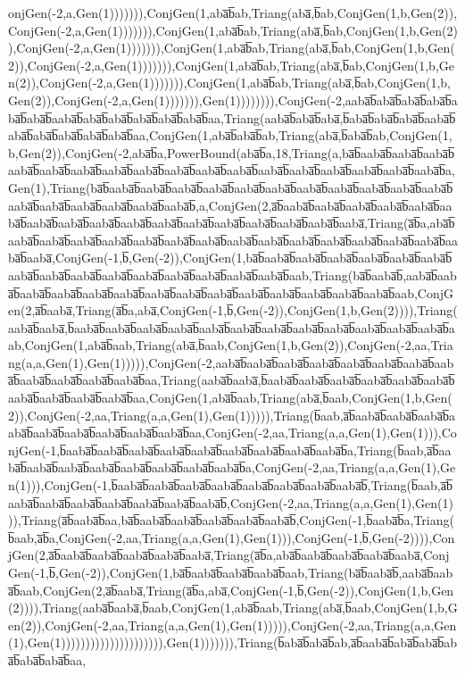 onjGen(-2,a,Gen(1))))))),ConjGen(1,aba̅b̅ab,Triang(aba̅,b̅ab,ConjGen(1,b,Gen(2)),ConjGen(-2,a,Gen(1))))))),ConjGen(1,aba̅b̅ab,Triang(aba̅,b̅ab,ConjGen(1,b,Gen(2)),ConjGen(-2,a,Gen(1))))))),ConjGen(1,aba̅b̅ab,Triang(aba̅,b̅ab,ConjGen(1,b,Gen(2)),ConjGen(-2,a,Gen(1))))))),ConjGen(1,aba̅b̅ab,Triang(aba̅,b̅ab,ConjGen(1,b,Gen(2)),ConjGen(-2,a,Gen(1))))))),ConjGen(1,aba̅b̅ab,Triang(aba̅,b̅ab,ConjGen(1,b,Gen(2)),ConjGen(-2,a,Gen(1))))))),Gen(1)))))))),ConjGen(-2,aaba̅b̅aba̅b̅aba̅b̅aba̅b̅aba̅b̅aba̅b̅aaba̅b̅aba̅b̅aba̅b̅aba̅b̅aba̅b̅aba̅b̅aa,Triang(aaba̅b̅aba̅b̅aba̅,b̅aba̅b̅aba̅b̅aba̅b̅aaba̅b̅aba̅b̅aba̅b̅aba̅b̅aba̅b̅aba̅b̅aa,ConjGen(1,aba̅b̅aba̅b̅ab,Triang(aba̅,b̅aba̅b̅ab,ConjGen(1,b,Gen(2)),ConjGen(-2,aba̅b̅a,PowerBound(aba̅b̅a,18,Triang(a,ba̅b̅aaba̅b̅aaba̅b̅aaba̅b̅aaba̅b̅aaba̅b̅aaba̅b̅aaba̅b̅aaba̅b̅aaba̅b̅aaba̅b̅aaba̅b̅aaba̅b̅aaba̅b̅aaba̅b̅aaba̅b̅aaba̅b̅aaba̅b̅a,Gen(1),Triang(ba̅b̅aaba̅b̅aaba̅b̅aaba̅b̅aaba̅b̅aaba̅b̅aaba̅b̅aaba̅b̅aaba̅b̅aaba̅b̅aaba̅b̅aaba̅b̅aaba̅b̅aaba̅b̅aaba̅b̅aaba̅b̅aaba̅b̅aaba̅b̅,a,ConjGen(2,a̅b̅aaba̅b̅aaba̅b̅aaba̅b̅aaba̅b̅aaba̅b̅aaba̅b̅aaba̅b̅aaba̅b̅aaba̅b̅aaba̅b̅aaba̅b̅aaba̅b̅aaba̅b̅aaba̅b̅aaba̅b̅aaba̅b̅aaba̅,Triang(a̅b̅a,aba̅b̅aaba̅b̅aaba̅b̅aaba̅b̅aaba̅b̅aaba̅b̅aaba̅b̅aaba̅b̅aaba̅b̅aaba̅b̅aaba̅b̅aaba̅b̅aaba̅b̅aaba̅b̅aaba̅b̅aaba̅b̅aaba̅,ConjGen(-1,b̅,Gen(-2)),ConjGen(1,ba̅b̅aaba̅b̅aaba̅b̅aaba̅b̅aaba̅b̅aaba̅b̅aaba̅b̅aaba̅b̅aaba̅b̅aaba̅b̅aaba̅b̅aaba̅b̅aaba̅b̅aaba̅b̅aaba̅b̅aaba̅b̅aab,Triang(ba̅b̅aaba̅b̅,aaba̅b̅aaba̅b̅aaba̅b̅aaba̅b̅aaba̅b̅aaba̅b̅aaba̅b̅aaba̅b̅aaba̅b̅aaba̅b̅aaba̅b̅aaba̅b̅aaba̅b̅aaba̅b̅aab,ConjGen(2,a̅b̅aaba̅,Triang(a̅b̅a,aba̅,ConjGen(-1,b̅,Gen(-2)),ConjGen(1,b,Gen(2)))),Triang(aaba̅b̅aaba̅,b̅aaba̅b̅aaba̅b̅aaba̅b̅aaba̅b̅aaba̅b̅aaba̅b̅aaba̅b̅aaba̅b̅aaba̅b̅aaba̅b̅aaba̅b̅aaba̅b̅aab,ConjGen(1,aba̅b̅aab,Triang(aba̅,b̅aab,ConjGen(1,b,Gen(2)),ConjGen(-2,aa,Triang(a,a,Gen(1),Gen(1))))),ConjGen(-2,aaba̅b̅aaba̅b̅aaba̅b̅aaba̅b̅aaba̅b̅aaba̅b̅aaba̅b̅aaba̅b̅aaba̅b̅aaba̅b̅aaba̅b̅aaba̅b̅aa,Triang(aaba̅b̅aaba̅,b̅aaba̅b̅aaba̅b̅aaba̅b̅aaba̅b̅aaba̅b̅aaba̅b̅aaba̅b̅aaba̅b̅aaba̅b̅aaba̅b̅aa,ConjGen(1,aba̅b̅aab,Triang(aba̅,b̅aab,ConjGen(1,b,Gen(2)),ConjGen(-2,aa,Triang(a,a,Gen(1),Gen(1))))),Triang(b̅aab,a̅b̅aaba̅b̅aaba̅b̅aaba̅b̅aaba̅b̅aaba̅b̅aaba̅b̅aaba̅b̅aaba̅b̅aaba̅b̅aa,ConjGen(-2,aa,Triang(a,a,Gen(1),Gen(1))),ConjGen(-1,b̅aaba̅b̅aaba̅b̅aaba̅b̅aaba̅b̅aaba̅b̅aaba̅b̅aaba̅b̅aaba̅b̅aaba̅b̅a,Triang(b̅aab,a̅b̅aaba̅b̅aaba̅b̅aaba̅b̅aaba̅b̅aaba̅b̅aaba̅b̅aaba̅b̅aaba̅b̅a,ConjGen(-2,aa,Triang(a,a,Gen(1),Gen(1))),ConjGen(-1,b̅aaba̅b̅aaba̅b̅aaba̅b̅aaba̅b̅aaba̅b̅aaba̅b̅aaba̅b̅aaba̅b̅,Triang(b̅aab,a̅b̅aaba̅b̅aaba̅b̅aaba̅b̅aaba̅b̅aaba̅b̅aaba̅b̅aaba̅b̅,ConjGen(-2,aa,Triang(a,a,Gen(1),Gen(1))),Triang(a̅b̅aaba̅b̅aa,ba̅b̅aaba̅b̅aaba̅b̅aaba̅b̅aaba̅b̅aaba̅b̅,ConjGen(-1,b̅aaba̅b̅a,Triang(b̅aab,a̅b̅a,ConjGen(-2,aa,Triang(a,a,Gen(1),Gen(1))),ConjGen(-1,b̅,Gen(-2)))),ConjGen(2,a̅b̅aaba̅b̅aaba̅b̅aaba̅b̅aaba̅b̅aaba̅,Triang(a̅b̅a,aba̅b̅aaba̅b̅aaba̅b̅aaba̅b̅aaba̅,ConjGen(-1,b̅,Gen(-2)),ConjGen(1,ba̅b̅aaba̅b̅aaba̅b̅aaba̅b̅aab,Triang(ba̅b̅aaba̅b̅,aaba̅b̅aaba̅b̅aab,ConjGen(2,a̅b̅aaba̅,Triang(a̅b̅a,aba̅,ConjGen(-1,b̅,Gen(-2)),ConjGen(1,b,Gen(2)))),Triang(aaba̅b̅aaba̅,b̅aab,ConjGen(1,aba̅b̅aab,Triang(aba̅,b̅aab,ConjGen(1,b,Gen(2)),ConjGen(-2,aa,Triang(a,a,Gen(1),Gen(1))))),ConjGen(-2,aa,Triang(a,a,Gen(1),Gen(1))))))))))))))))))))),Gen(1))))))),Triang(b̅aba̅b̅aba̅b̅ab,a̅b̅aaba̅b̅aba̅b̅aba̅b̅aba̅b̅aba̅b̅aba̅b̅aa,